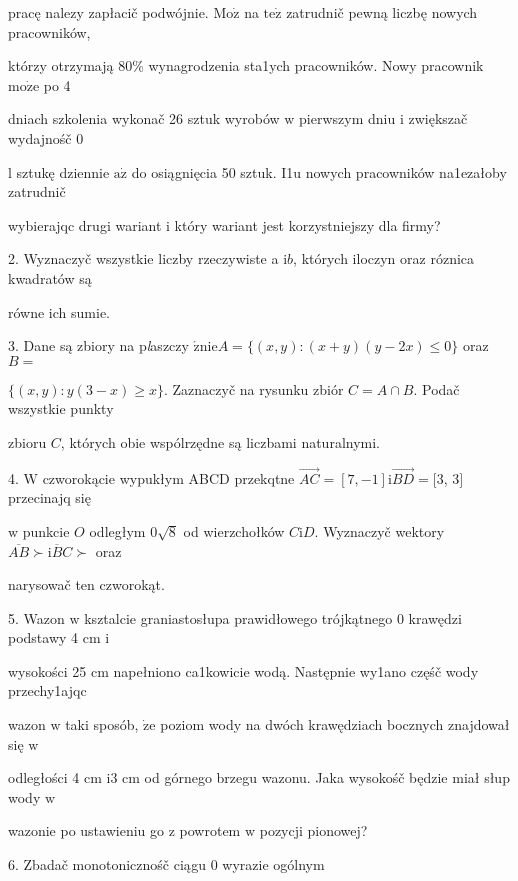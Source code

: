 \documentclass[a4paper,12pt]{article}
\begin{document}
pracę nalezy zapłacič podwójnie. $\mathrm{M}\mathrm{o}\dot{\mathrm{z}}$ na $\mathrm{t}\mathrm{e}\dot{\mathrm{z}}$ zatrudnič pewną liczbę nowych pracowników,

którzy otrzymają 80\% wynagrodzenia sta1ych pracowników. Nowy pracownik $\mathrm{m}\mathrm{o}\dot{\mathrm{z}}\mathrm{e}$ po 4

dniach szkolenia wykonač 26 sztuk wyrobów $\mathrm{w}$ pierwszym dniu $\mathrm{i}$ zwiększač wydajnośč $0$

l sztukę dziennie $\mathrm{a}\dot{\mathrm{z}}$ do osiągnięcia 50 sztuk. I1u nowych pracowników na1ezałoby zatrudnič

wybierajqc drugi wariant $\mathrm{i}$ który wariant jest korzystniejszy dla firmy?

2. Wyznaczyč wszystkie liczby rzeczywiste a $\mathrm{i}b$, których iloczyn oraz róznica kwadratów są

równe ich sumie.

3. Dane są zbiory na p{\it l}aszczy $\acute{\mathrm{z}}\mathrm{n}\mathrm{i}\mathrm{e}A=\{(x,y):(x+y)(y-2x)\leq 0\}$ oraz $B=$

$\{(x,y):y(3-x)\geq x\}$. Zaznaczyč na rysunku zbiór $C=A\cap B$. Podač wszystkie punkty

zbioru $C$, których obie wspólrzędne są liczbami naturalnymi.

4. $\mathrm{W}$ czworokącie wypukłym ABCD przekqtne $\vec{AC}= [7,-1] \mathrm{i} \vec{BD}= [3$, 3$]$ przecinajq się

$\mathrm{w}$ punkcie $O$ odległym $0\sqrt{8}$ od wierzchołków $C\mathrm{i}D$. Wyznaczyč wektory $\overline{AB}\succ \mathrm{i}\overline{B}C\succ$ oraz

narysowač ten czworokąt.

5. Wazon $\mathrm{w}$ ksztalcie graniastosłupa prawidłowego trójkątnego $0$ krawędzi podstawy 4 cm $\mathrm{i}$

wysokości 25 cm napełniono ca1kowicie wodą. Następnie wy1ano częśč wody przechy1ajqc

wazon $\mathrm{w}$ taki sposób, $\dot{\mathrm{z}}\mathrm{e}$ poziom wody na dwóch krawędziach bocznych znajdował się $\mathrm{w}$

odległości 4 cm $\mathrm{i}3$ cm od górnego brzegu wazonu. Jaka wysokośč będzie miał słup wody $\mathrm{w}$

wazonie po ustawieniu go $\mathrm{z}$ powrotem $\mathrm{w}$ pozycji pionowej?

6. Zbadač monotonicznośč ciągu $0$ wyrazie ogólnym
\end{document}
